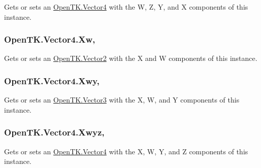 Gets or sets an \hyperlink{struct_open_t_k_1_1_vector4}{Open\-T\-K.\-Vector4} with the W, Z, Y, and X components of this instance. 

\hypertarget{struct_open_t_k_1_1_vector4_a6585c77b5bef07e93623c8d274ffd8ab}{
\subsubsection[{Xw}]{ Open\-T\-K.\-Vector4.\-Xw\hspace{0.3cm}{\ttfamily [get]}, {\ttfamily [set]}}}\label{struct_open_t_k_1_1_vector4_a6585c77b5bef07e93623c8d274ffd8ab}


Gets or sets an \hyperlink{struct_open_t_k_1_1_vector2}{Open\-T\-K.\-Vector2} with the X and W components of this instance. 

\hypertarget{struct_open_t_k_1_1_vector4_ad7ab464b8656b0bdade7b3dfc832e057}{
\subsubsection[{Xwy}]{ Open\-T\-K.\-Vector4.\-Xwy\hspace{0.3cm}{\ttfamily [get]}, {\ttfamily [set]}}}\label{struct_open_t_k_1_1_vector4_ad7ab464b8656b0bdade7b3dfc832e057}


Gets or sets an \hyperlink{struct_open_t_k_1_1_vector3}{Open\-T\-K.\-Vector3} with the X, W, and Y components of this instance. 

\hypertarget{struct_open_t_k_1_1_vector4_a757c3ecc2f21a65847b654624afa64e2}{
\subsubsection[{Xwyz}]{ Open\-T\-K.\-Vector4.\-Xwyz\hspace{0.3cm}{\ttfamily [get]}, {\ttfamily [set]}}}\label{struct_open_t_k_1_1_vector4_a757c3ecc2f21a65847b654624afa64e2}


Gets or sets an \hyperlink{struct_open_t_k_1_1_vector4}{Open\-T\-K.\-Vector4} with the X, W, Y, and Z components of this instance. 

